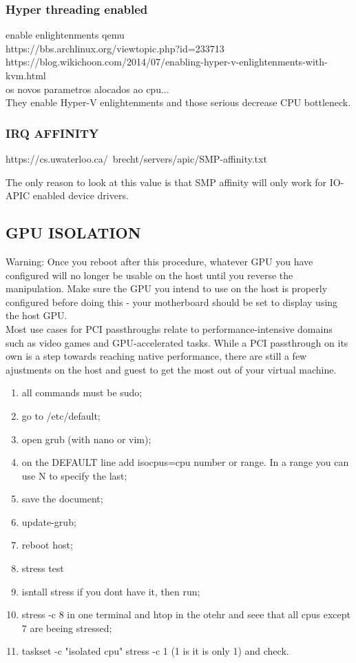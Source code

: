 \documentclass[11pt, a4paper, oneside]{article}
\theoremstyle{definition}
\begin{document}
\subsubsection{Hyper threading enabled}
enable enlightenments qemu\\
https://bbs.archlinux.org/viewtopic.php?id=233713\\
https://blog.wikichoon.com/2014/07/enabling-hyper-v-enlightenments-with-kvm.html\\

os novos parametros alocados ao cpu...\\
They enable Hyper-V enlightenments and those serious decrease CPU bottleneck.

\subsubsection{IRQ AFFINITY}
https://cs.uwaterloo.ca/~brecht/servers/apic/SMP-affinity.txt

The only reason to look at this value is that 
SMP affinity will only work for IO-APIC enabled device drivers.


\vfill
\pagebreak
\subsection{GPU ISOLATION}
Warning: Once you reboot after this procedure, whatever GPU you have configured will no longer be usable on the host until you reverse the manipulation. Make sure the GPU you intend to use on the host is properly configured before doing this - your motherboard should be set to display using the host GPU.\\

Most use cases for PCI passthroughs relate to performance-intensive domains such as video games and GPU-accelerated tasks. While a PCI passthrough on its own is a step towards reaching native performance, there are still a few ajustments on the host and guest to get the most out of your virtual machine. \\

\begin{enumerate}
	\item all commands must be sudo;
	\item go to /etc/default;
	\item open grub (with nano or vim);
	\item on the DEFAULT line add isocpus=cpu number or range. In a range you can use N to specify the last;
	\item save the document;
	\item update-grub;
	\item reboot host;
	\item stress test
		\item isntall stress if you dont have it, then run;
			\item stress -c 8 in one terminal and htop in the otehr and seee that all cpus except 7 are beeing stressed;
			\item taskset -c "isolated cpu" stress -c 1 (1 is it is only 1) and check.
\end{enumerate}
\end{document}

